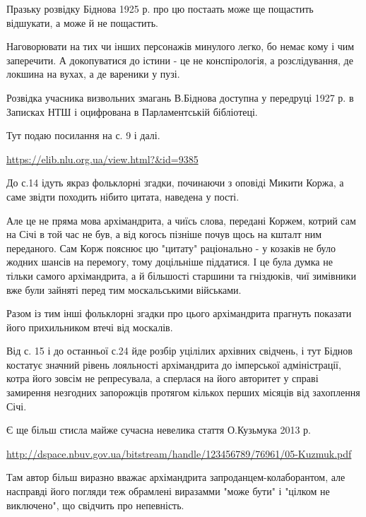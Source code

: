 \begin{itemize}
\begin{itemize}
Празьку розвідку Біднова 1925 р. про цю постаать може ще пощастить відшукати, а
може й не пощастить.

Наговорювати на тих чи інших персонажів минулого легко, бо немає кому і чим
заперечити. А докопуватися до істини - це не конспірологія, а розслідування, де
локшина на вухах, а де вареники у пузі.

 

Розвідка учасника визвольних змагань В.Біднова доступна у передруці 1927 р. в
Записках НТШ і оцифрована в Парламентській бібліотеці.

Тут подаю посилання на с. 9 і далі.

\url{https://elib.nlu.org.ua/view.html?&id=9385}

До с.14 ідуть якраз фольклорні згадки, починаючи з оповіді Микити Коржа, а саме
звідти походить нібито цитата, наведена у пості.

Але це не пряма мова архімандрита, а чиїсь слова, передані Коржем, котрий сам
на Січі в той час не був, а від когось пізніше почув щось на кшталт ним
переданого. Сам Корж пояснює цю "цитату" раціонально - у козаків не було жодних
шансів на перемогу, тому доцільніше піддатися. І це була думка не тільки самого
архімандрита, а й більшості старшини та гніздюків, чиї зимівники вже були
зайняті перед тим москальськими військами.

Разом із тим інші фольклорні згадки про цього архімандрита прагнуть показати
його прихильником втечі від москалів.

Від с. 15 і до останньої с.24 йде розбір уцілілих архівних свідчень, і тут
Біднов костатує значний рівень лояльності архімандрита до імперської
адміністрації, котра його зовсім не репресувала, а сперлася на його авторитет у
справі замирення незгодних запорожців протягом кількох перших місяців від
захоплення Січі.

Є ще більш стисла майже сучасна невелика стаття О.Кузьмука 2013 р. 

\url{http://dspace.nbuv.gov.ua/bitstream/handle/123456789/76961/05-Kuzmuk.pdf}

Там автор більш виразно вважає архімандрита запроданцем-колаборантом, але
насправді його погляди теж обрамлені виразамми "може бути" і "цілком не
виключено", що свідчить про непевність.


\end{itemize}
\end{itemize}
